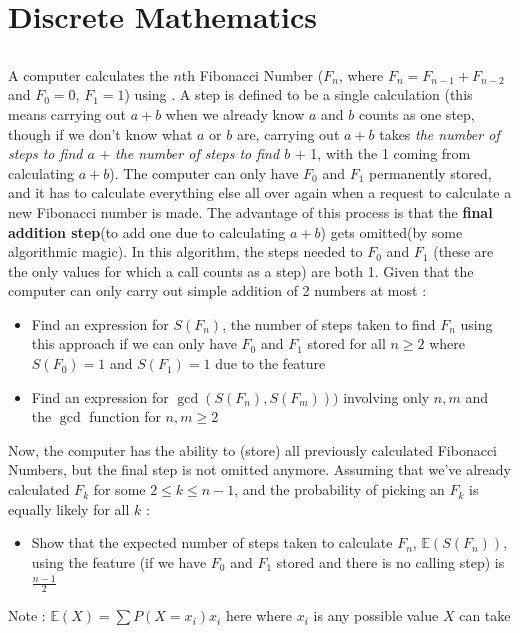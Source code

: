 \documentclass[12pt]{article}
\begin{document}
\newpage




\section*{Discrete Mathematics}






\subsection*{}
A computer calculates the $n$th Fibonacci Number ($F_n$, where $F_n = F_{n-1}+F_{n-2}$ and $F_0 = 0$, $F_1 =1$) using . A step is defined to be a single calculation (this means carrying out $a + b$ when we already know $a$ and $b$ counts as one step, though if we don't know what $a$ or $b$ are, carrying out $a+b$ takes \textit{the number of steps to find $a$} + \textit{the number of steps to find $b$} + 1, with the 1 coming from calculating $a+b$). The computer can only have $F_0$ and $F_1$ permanently stored, and it has to calculate everything else all over again when a request to calculate a new Fibonacci number is made. The advantage of this process is that the \textbf{final addition step}(to add one due to calculating $a+b$) gets omitted(by some algorithmic magic). In this algorithm, the steps needed to  $F_0$ and $F_1$ (these are the only values for which a call counts as a step) are both 1. Given that the computer can only carry out simple addition of 2 numbers at most : 
\begin{itemize}
    \item Find an expression for $S(F_n)$, the number of steps taken to find $F_n$ using this approach if we can only have $F_0$ and $F_1$ stored for all $n \geq 2$ where $S(F_0) = 1$ and $S(F_1) = 1$ due to the  feature
    \item Find an expression for $\gcd(S(F_n),S(F_m)))$ involving only $n,m$ and the $\gcd$ function for $n,m \geq 2$
\end{itemize}
Now, the computer has the ability to  (store) all previously calculated Fibonacci Numbers, but the final step is not omitted anymore. Assuming that we've already calculated $F_k$ for some $2\leq k \leq n-1$, and the probability of picking an $F_k$ is equally likely for all $k$ : 
\begin{itemize}
    \item Show that the expected number of steps taken to calculate $F_n$,  $\mathbb{E}(S(F_n))$, using the  feature (if we have $F_0$ and $F_1$ stored and there is no calling step) is $\frac{n-1}{2}$
\end{itemize}
Note : $\mathbb{E}(X) = \displaystyle \sum P(X=x_i)x_i$ here where $x_i$ is any possible value $X$ can take
\end{document}
